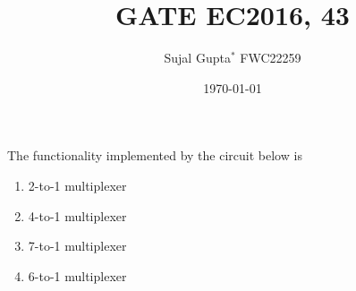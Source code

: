 \documentclass[10pt,-letter paper]{article}
\begin{document}
\author{Sujal Gupta$^{*}$ FWC22259}
\title{GATE EC2016, 43}
\date{\today}

\maketitle

\bigskip
The functionality implemented by the circuit below is

\begin{figure}[!ht]
\centering

\label{fig:multiplexer}
\end{figure}

\begin{enumerate}[label=\Alph*.]
\item 2-to-1 multiplexer
\item 4-to-1 multiplexer
\item 7-to-1 multiplexer
\item 6-to-1 multiplexer
\end{enumerate}
\end{document}
